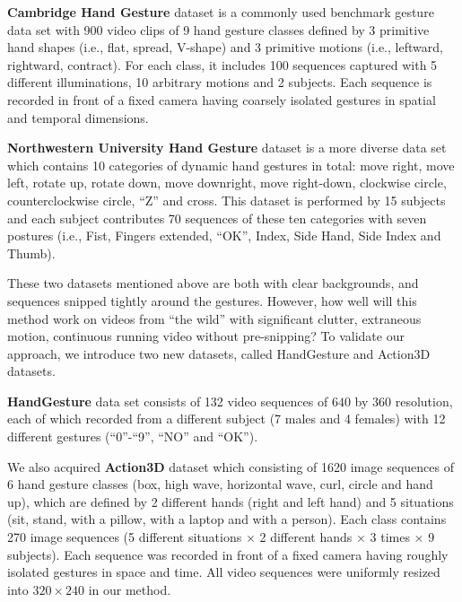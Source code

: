 \documentclass[5p]{elsarticle}
\begin{document}
\textbf{Cambridge Hand Gesture} dataset is a commonly used benchmark gesture data set with 900 video clips of 9 hand gesture classes defined by 3 primitive hand shapes (i.e., flat, spread, V-shape) and 3 primitive motions (i.e., leftward, rightward, contract).
For each class, it includes 100 sequences captured with 5 different illuminations, 10 arbitrary motions and 2 subjects.
Each sequence is recorded in front of a fixed camera having coarsely isolated gestures in spatial and temporal dimensions.

\textbf{Northwestern University Hand Gesture} dataset is a more diverse data set which contains 10 categories of dynamic hand gestures in total: move right, move left, rotate up, rotate down, move downright, move right-down, clockwise circle, counterclockwise circle, ``Z'' and cross.
This dataset is performed by 15 subjects and each subject contributes 70 sequences of these ten categories with seven postures (i.e., Fist, Fingers extended, ``OK'', Index, Side Hand, Side Index and Thumb).

These two datasets mentioned above are both with clear backgrounds, and sequences snipped tightly around the gestures.
However, how well will this method work on videos from ``the wild'' with significant clutter, extraneous motion, continuous running video without pre-snipping?
To validate our approach, we introduce two new datasets, called HandGesture and Action3D datasets.

\textbf{HandGesture} data set consists of 132 video sequences of $640$ by $360$ resolution, each of which recorded from a different subject (7 males and 4 females) with 12 different gestures (``0''-``9'', ``NO'' and ``OK'').

We also acquired \textbf{Action3D} dataset which consisting of 1620 image sequences of 6 hand gesture classes (box, high wave, horizontal wave, curl, circle and hand up), which are defined by 2 different hands (right and left hand) and 5 situations (sit, stand, with a pillow, with a laptop and with a person).
Each class contains 270 image sequences (5 different situations $\times$ 2 different hands $\times$ 3 times $\times$ 9 subjects).
Each sequence was recorded in front of a fixed camera having roughly isolated gestures in space and time.
All video sequences were uniformly resized into $320 \times 240$ in our method.
\end{document}
